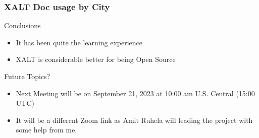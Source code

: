 \documentclass{beamer}
\begin{document}
\begin{frame}[fragile]
    \frametitle{XALT Doc usage by City}
\end{frame}

\begin{frame}{Conclusions}
  \begin{itemize}
    \item It has been quite the learning experience
    \item XALT is considerable better for being Open Source
  \end{itemize}
\end{frame}

\begin{frame}{Future Topics?}
  \begin{itemize}
    \item Next Meeting will be on September 21, 2023 at 10:00 am
      U.S. Central (15:00 UTC)
    \item It will be a different Zoom link as Amit Ruhela will leading
      the project with some help from me.
  \end{itemize}
\end{frame}

%
\end{document}
